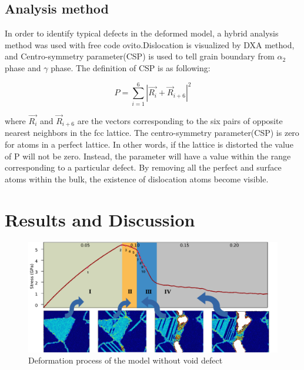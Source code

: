 \documentclass[metals,article,submit,moreauthors,pdftex,10pt,a4paper]{Definitions/mdpi}
\begin{document}
	
\subsection{Analysis method}
In order to identify typical defects in the deformed model, a hybrid analysis method was used with free code ovito\cite{Stukowski2010a}.Dislocation is visualized by DXA method, and Centro-symmetry parameter(CSP) is used to tell grain boundary from  $\alpha_2$ phase and $\gamma$ phase. The definition of CSP is as following:

	\begin{equation} \label{eq:csp} 
	P = \displaystyle\sum_{i=1}^{6}|\vec{R_i}+{\vec{R}}_{i+6}|^2
	\end{equation}
	
where $\vec{R_i}$ and ${\vec{R}}_{i+6}$ are the vectors corresponding to the six pairs of opposite nearest neighbors in the fcc lattice. The centro-symmetry parameter(CSP) is zero for atoms in a perfect lattice. In other words, if the lattice is distorted the value of P will not be zero. Instead, the parameter will have a value within the range corresponding to a particular defect. By removing all the perfect and surface atoms within the bulk, the existence of dislocation atoms become visible. 
 
\section{Results and Discussion}\label{section:RD}

\begin{figure}[ht]
	\centering
	\includegraphics[width=1\linewidth]{img/perfect-line2-2}
	\caption{Deformation process of the model without void defect}
	\label{fig:deformation-pf}
\end{figure}
\end{document}
